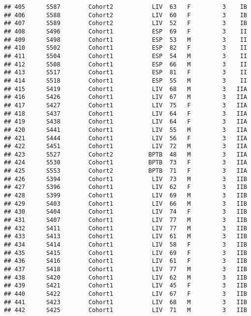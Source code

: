 \documentclass[
]{article}
\begin{document}
\begin{verbatim}
## 405      S587        Cohort2           LIV  63   F         3    IB
## 406      S588        Cohort2           LIV  60   F         3    IB
## 407      S589        Cohort2           LIV  52   F         3    IB
## 408      S496        Cohort1           ESP  69   F         3    II
## 409      S498        Cohort1           ESP  53   M         3    II
## 410      S502        Cohort1           ESP  82   F         3    II
## 411      S504        Cohort1           ESP  54   M         3    II
## 412      S508        Cohort1           ESP  66   M         3    II
## 413      S517        Cohort1           ESP  81   F         3    II
## 414      S518        Cohort1           ESP  55   M         3    II
## 415      S419        Cohort1           LIV  68   M         3   IIA
## 416      S426        Cohort1           LIV  67   M         3   IIA
## 417      S427        Cohort1           LIV  75   F         3   IIA
## 418      S437        Cohort1           LIV  64   F         3   IIA
## 419      S438        Cohort1           LIV  64   F         3   IIA
## 420      S441        Cohort1           LIV  55   M         3   IIA
## 421      S444        Cohort1           LIV  56   F         3   IIA
## 422      S451        Cohort1           LIV  72   M         3   IIA
## 423      S527        Cohort2          BPTB  48   M         3   IIA
## 424      S530        Cohort1          BPTB  73   F         3   IIA
## 425      S553        Cohort2          BPTB  71   F         3   IIA
## 426      S394        Cohort1           LIV  73   M         3   IIB
## 427      S396        Cohort1           LIV  62   F         3   IIB
## 428      S399        Cohort1           LIV  69   M         3   IIB
## 429      S403        Cohort1           LIV  66   M         3   IIB
## 430      S404        Cohort1           LIV  74   F         3   IIB
## 431      S407        Cohort1           LIV  77   M         3   IIB
## 432      S411        Cohort1           LIV  77   M         3   IIB
## 433      S413        Cohort1           LIV  61   M         3   IIB
## 434      S414        Cohort1           LIV  58   F         3   IIB
## 435      S415        Cohort1           LIV  69   F         3   IIB
## 436      S416        Cohort1           LIV  61   F         3   IIB
## 437      S418        Cohort1           LIV  77   M         3   IIB
## 438      S420        Cohort1           LIV  62   M         3   IIB
## 439      S421        Cohort1           LIV  45   F         3   IIB
## 440      S422        Cohort1           LIV  67   F         3   IIB
## 441      S423        Cohort1           LIV  68   M         3   IIB
## 442      S425        Cohort1           LIV  71   M         3   IIB

\end{verbatim}
\end{document}
